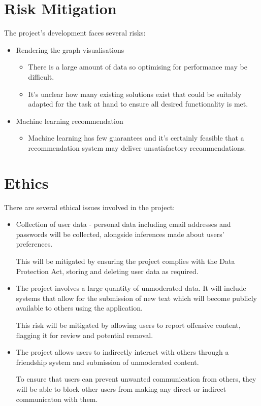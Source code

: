 %
%
\section{Risk Mitigation}


The project's development faces several risks:
\begin{itemize}
    \item Rendering the graph visualisations
        \begin{itemize}
            \item There is a large amount of data so optimising for performance may be difficult.
            \item It's unclear how many existing solutions exist that could be suitably adapted for the task at hand to ensure all desired functionality is met.
        \end{itemize}
    \item Machine learning recommendation
        \begin{itemize}
            \item Machine learning has few guarantees and it's certainly feasible that a recommendation system may deliver unsatisfactory recommendations.
        \end{itemize}
\end{itemize}

%
%
\section{Ethics}

There are several ethical issues involved in the project:
\begin{itemize}
\item Collection of user data - personal data including email addresses and passwords will be collected, alongside inferences made about users' preferences.

This will be mitigated by ensuring the project complies with the Data Protection Act, storing and deleting user data as required. 
\item The project involves a large quantity of unmoderated data. It will include systems that allow for the submission of new text which will become publicly available to others using the application. 

This risk will be mitigated by allowing users to report offensive content, flagging it for review and potential removal.
\item The project allows users to indirectly interact with others through a friendship system and submission of unmoderated content.

To ensure that users can prevent unwanted communication from others, they will be able to block other users from making any direct or indirect communicaton with them.
\end{itemize}